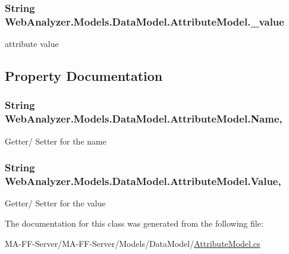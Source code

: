 \subsubsection[{\+\_\+value}]{\setlength{\rightskip}{0pt plus 5cm}String Web\+Analyzer.\+Models.\+Data\+Model.\+Attribute\+Model.\+\_\+value\hspace{0.3cm}{\ttfamily [private]}}\label{class_web_analyzer_1_1_models_1_1_data_model_1_1_attribute_model_a78fd60dadcd65ac87ef1fb49ec497055}


attribute value 



\subsection{Property Documentation}
\hypertarget{class_web_analyzer_1_1_models_1_1_data_model_1_1_attribute_model_aed6ff726ffc8f9848b312f1dcb03594b}{}
\subsubsection[{Name}]{\setlength{\rightskip}{0pt plus 5cm}String Web\+Analyzer.\+Models.\+Data\+Model.\+Attribute\+Model.\+Name\hspace{0.3cm}{\ttfamily [get]}, {\ttfamily [set]}}\label{class_web_analyzer_1_1_models_1_1_data_model_1_1_attribute_model_aed6ff726ffc8f9848b312f1dcb03594b}


Getter/ Setter for the name 

\hypertarget{class_web_analyzer_1_1_models_1_1_data_model_1_1_attribute_model_a132abb603aaf2d5bd36c3c3477b1c21d}{}
\subsubsection[{Value}]{\setlength{\rightskip}{0pt plus 5cm}String Web\+Analyzer.\+Models.\+Data\+Model.\+Attribute\+Model.\+Value\hspace{0.3cm}{\ttfamily [get]}, {\ttfamily [set]}}\label{class_web_analyzer_1_1_models_1_1_data_model_1_1_attribute_model_a132abb603aaf2d5bd36c3c3477b1c21d}


Getter/ Setter for the value 



The documentation for this class was generated from the following file\+:\begin{DoxyCompactItemize}
\item 
M\+A-\/\+F\+F-\/\+Server/\+M\+A-\/\+F\+F-\/\+Server/\+Models/\+Data\+Model/\hyperlink{_attribute_model_8cs}{Attribute\+Model.\+cs}\end{DoxyCompactItemize}
